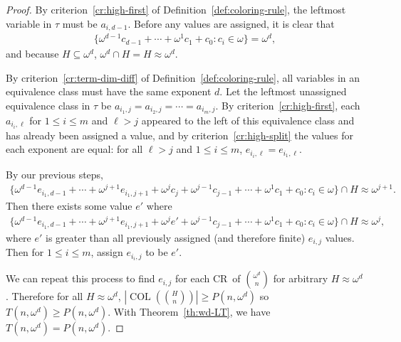 \documentclass[11pt]{article}
\newcommand{\om}{\omega}
\newcommand{\oequiv}{\approx}
\newcommand{\COL}{\operatorname{COL}}
\newcommand{\crulenospace}{CR}
\newcommand{\crule}{\crulenospace~}
\newcommand{\numpoints}{n}
\newcommand{\inumpoints}{i}
\newcommand{\idegr}{j}
\newcommand{\commonconst}{a}
\theoremstyle{plain}
\theoremstyle{definition}
\begin{document}
\begin{proof}
By criterion~\ref{cr:high-first} of 
Definition~\ref{def:coloring-rule}, 
the leftmost variable in $\tau$ must be $\commonconst_{\inumpoints,d-1}$. Before any values are assigned, it is clear that \begin{align*}\{ \om^{d-1} c_{d-1} + \cdots + \om^1 c_1 + c_0 : c_i \in \om\} = \om^{d},\end{align*} and because $H \subseteq \om^{d}$, $\om^{d} \cap H = H \oequiv \om^{d}$.

By criterion~\ref{cr:term-dim-diff} of 
Definition~\ref{def:coloring-rule}, all variables in an equivalence class must have the same exponent $d$. Let the leftmost unassigned equivalence class in $\tau$ be $\commonconst_{\inumpoints_1,\idegr} = \commonconst_{\inumpoints_2,\idegr} = \cdots = \commonconst_{\inumpoints_m,\idegr}$.
By criterion~\ref{cr:high-first}, each $\commonconst_{\inumpoints_i,\ell}$ for $1 \leq i \leq m$ and $\ell > \idegr$ appeared to the left of this equivalence class and has already been assigned a value, and by criterion~\ref{cr:high-split} the values for each exponent are equal: for all $\ell > \idegr$ and $1 \leq i \leq m$, $e_{\inumpoints_i,\ell} = e_{\inumpoints_1,\ell}$.

By our previous steps, \begin{multline*}\{ \om^{d-1} e_{\inumpoints_1,d-1} + \cdots + \om^{\idegr+1} e_{\inumpoints_1,\idegr+1} + \om^{\idegr} c_{\idegr} + \om^{\idegr-1} c_{\idegr-1} + \cdots + \om^1 c_1 + c_0 : c_i \in \om\} \cap H \oequiv \om^{\idegr+1}.\end{multline*}
Then there exists some value $e'$ where \begin{multline*}\{ \om^{d-1} e_{\inumpoints_1,d-1} + \cdots + \om^{\idegr+1} e_{\inumpoints_1,\idegr+1} + \om^{\idegr} e' + \om^{\idegr-1} c_{\idegr-1} + \cdots + \om^1 c_1 + c_0 : c_i \in \om\} \cap H \oequiv \om^{\idegr},
\end{multline*} where $e'$ is greater than all previously assigned (and therefore finite) $e_{\inumpoints,\idegr}$ values. Then for $1 \leq i \leq m$, assign $e_{\inumpoints_i,\idegr}$ to be $e'$.

We can repeat this process to find $e_{\inumpoints,\idegr}$ for each \crule of $\binom{\om^d}{\numpoints}$ for arbitrary $H \oequiv \om^{d}$. Therefore for all 
$H \oequiv \omega^d$,
$\left|\COL\left(\binom{H}{\numpoints}\right)\right|\geq P(\numpoints,\om^d)$ so
$T(\numpoints,\om^d) \geq P\left(\numpoints, \om^d\right)$. With
Theorem~\ref{th:wd-LT}, we have
$T(\numpoints,\om^d) = P\left(\numpoints, \om^d\right)$.

\end{proof}
\end{document}
